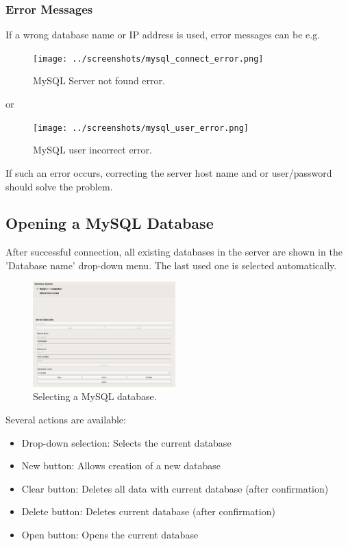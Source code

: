\subsubsection{Error Messages}

If a wrong database name or IP address is used, error messages can be e.g. \\

\begin{figure}[H]
  \center
    \texttt{[image: ../screenshots/mysql\_connect\_error.png]}
  \caption{MySQL Server not found error.}
\end{figure}

 or 

\begin{figure}[H]
  \center
    \texttt{[image: ../screenshots/mysql\_user\_error.png]}
  \caption{MySQL user incorrect error.}
\end{figure}

If such an error occurs, correcting the server host name and or user/password should solve the problem. 


\subsection{Opening a MySQL Database}
\label{sec:mysql_open_db}

After successful connection, all existing databases in the server are shown in the 'Database name' drop-down menu. The last used one is selected automatically.

\begin{figure}[H]
  \center
    \includegraphics[width=5.5cm,frame]{../screenshots/mysql_database_selection.png}
  \caption{Selecting a MySQL database.}
  \label{fig:mysql_db_select}
\end{figure}

Several actions are available:

\begin{itemize}  
\item Drop-down selection: Selects the current database
\item New button: Allows creation of a new database
\item Clear button: Deletes all data with current database (after confirmation)
\item Delete button: Deletes current database (after confirmation)
\item Open button: Opens the current database
\end{itemize} 
